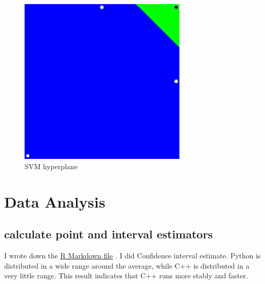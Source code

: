 \documentclass[11pt, a4paper]{article}
\begin{document}
\begin{figure}[htbp]
\centering
\includegraphics[clip, width=80mm]{result.png}
\caption{SVM hyperplane}
\end{figure}

\section{Data Analysis}
\subsection{calculate point and interval estimators}

I wrote down the \href{https://github.com/Rintarooo/time_cpp_python/blob/master/rmarkdown/ds.Rmd}{\underline{R Markdown file}} . I did Confidence interval estimate. Python is distributed in a wide range around the average, while C++ is distributed in a very little range. This result indicates that C++ runs more stably and faster. 

%
\end{document}
